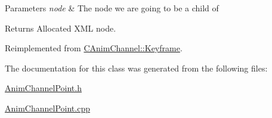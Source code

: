 \begin{DoxyParams}{Parameters}
{\em node} & The node we are going to be a child of \\
\hline
\end{DoxyParams}
\begin{DoxyReturn}{Returns}
Allocated X\+M\+L node. 
\end{DoxyReturn}


Reimplemented from \hyperlink{class_c_anim_channel_1_1_keyframe_a2dbc0b264510a45b9a429f64aa2d8448}{C\+Anim\+Channel\+::\+Keyframe}.



The documentation for this class was generated from the following files\+:\begin{DoxyCompactItemize}
\item 
\hyperlink{_anim_channel_point_8h}{Anim\+Channel\+Point.\+h}\item 
\hyperlink{_anim_channel_point_8cpp}{Anim\+Channel\+Point.\+cpp}\end{DoxyCompactItemize}

